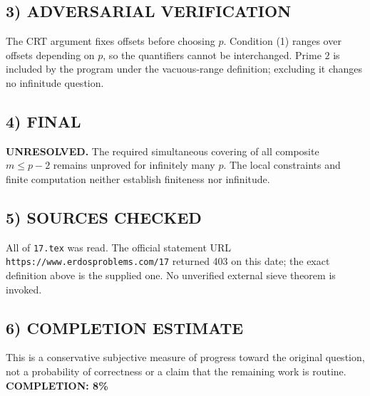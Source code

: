 \subsection{3) ADVERSARIAL VERIFICATION}
The CRT argument fixes offsets before choosing $p$. Condition (1) ranges over offsets depending on $p$, so the quantifiers cannot be interchanged. Prime $2$ is included by the program under the vacuous-range definition; excluding it changes no infinitude question.
\subsection{4) FINAL}
\textbf{UNRESOLVED.}
The required simultaneous covering of all composite $m\le p-2$ remains unproved for infinitely many $p$. The local constraints and finite computation neither establish finiteness nor infinitude.
\subsection{5) SOURCES CHECKED}
All of \texttt{17.tex} was read. The official statement URL \texttt{https://www.erdosproblems.com/17} returned 403 on this date; the exact definition above is the supplied one. No unverified external sieve theorem is invoked.
\subsection{6) COMPLETION ESTIMATE}
This is a conservative subjective measure of progress toward the original question, not a probability of correctness or a claim that the remaining work is routine.
\textbf{COMPLETION: 8\%}
